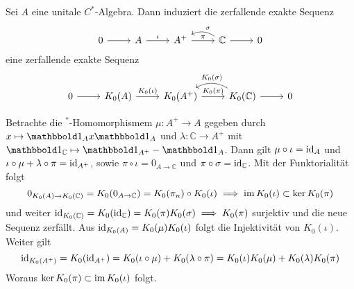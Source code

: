 \begin{proposition}[label=prop:615]
	Sei $A$ eine unitale $C^*$-Algebra.
	Dann induziert die zerfallende exakte Sequenz
	\[
		\begin{tikzcd}
			0 \rar & A \rar["\iota"] & A^+ \rar["\pi"] & \mathbb{C} \rar \lar["\sigma"', bend right] & 0
		\end{tikzcd}
	\]
	eine zerfallende exakte Sequenz
	\[
		\begin{tikzcd}
			0 \rar & K_0(A) \rar["K_0(\iota)"] & K_0(A^+) \rar["K_0(\pi)"] & K_0(\mathbb{C}) \rar  \lar["K_0(\sigma)"', bend right] & 0
		\end{tikzcd}
	\]
\end{proposition}
\begin{beweis}
	Betrachte die $^*$-Homomorphismem $\mu \colon A^+ \to A$ gegeben durch $x \mapsto \ind_A x \ind_A$ und $\lambda \colon \mathbb{C} \to A^+$ mit $\ind_\mathbb{C} \mapsto \ind_{A^+} - \ind_A$.
	Dann gilt $\mu \circ \iota = \operatorname{id}_A$ und $\iota \circ \mu + \lambda \circ \pi = \operatorname{id}_{A^+}$, sowie $\pi \circ \iota = 0_{A\to \mathbb{C}}$ und $\pi \circ \sigma = \operatorname{id}_\mathbb{C}$.
	Mit der Funktorialität folgt
	\[
		0_{K_0(A) \to K_0(\mathbb{C})} = K_0(0_{A \to \mathbb{C}}) = K_0(\pi_n) \circ K_0(\iota) \implies \operatorname{im} K_0(\iota) \subset \ker K_0(\pi)
	\]
	und weiter $\operatorname{id}_{K_0(\mathbb{C})} = K_0(\operatorname{id}_\mathbb{C}) = K_0(\pi) K_0(\sigma) \implies K_0(\pi)$ surjektiv und die neue Sequenz zerfällt.
	Aus $\operatorname{id}_{K_0(A)} = K_0(\mu) K_0(\iota)$ folgt die Injektivität von $K_0(\iota)$. Weiter gilt
	\[
		\operatorname{id}_{K_0(A^+)} = K_0(\operatorname{id}_{A^+}) = K_0(\iota \circ \mu) + K_0(\lambda \circ \pi) = K_0(\iota) K_0(\mu) + K_0(\lambda) K_0(\pi)
	\]
	Woraus $\ker K_0(\pi) \subset \operatorname{im} K_0(\iota)$ folgt.
\end{beweis}


